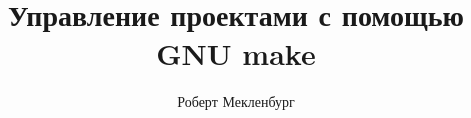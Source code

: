 \documentclass[openany,11pt]{book}
\author{Роберт Мекленбург}
\title{Управление проектами с помощью GNU make}
\begin{document}
\makeatletter
\g@addto@macro\@verbatim\footnotesize
\makeatother 

\maketitle
\frontmatter

\tableofcontents
\mainmatter


\printindex
\end{document}
